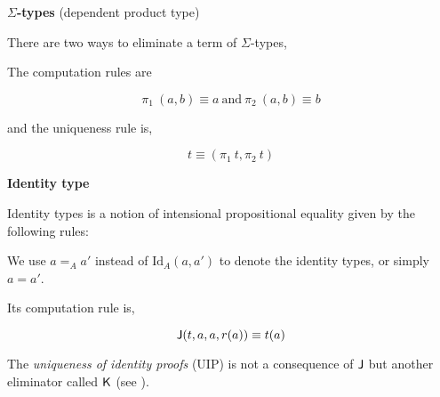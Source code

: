 \textbf{$\Sigma$-types} (dependent product type)


\begin{multicols}{2}
\columnbreak
{}
\end{multicols}

There are two ways to eliminate a term of $\Sigma$-types,

\begin{multicols}{2}
\columnbreak
{}
\end{multicols}

The computation rules are 

$$\pi_1 ~(a,b) \equiv a~ \text{and} ~ \pi_2 ~(a,b) \equiv b$$

and the uniqueness rule is,

$$t \equiv (\pi_1 ~t, \pi_2 ~t)$$

\textbf{Identity type}

Identity types is a notion of intensional propositional equality given by the following rules:

\begin{multicols}{2}
\columnbreak
{}
\end{multicols}

We use  $a =_{A} a'$ instead of $\text{Id}_A(a, a')$ to denote the identity types, or simply $a = a'$.


Its computation rule is,

$$\operatorname{\mathsf{J}} (t,a,a,r(a)) \equiv t(a)$$

The \emph{uniqueness of identity proofs} (UIP) is not a consequence of $\operatorname{\mathsf{J}}$ but another eliminator called $\operatorname{\mathsf{K}}$ (see ).

